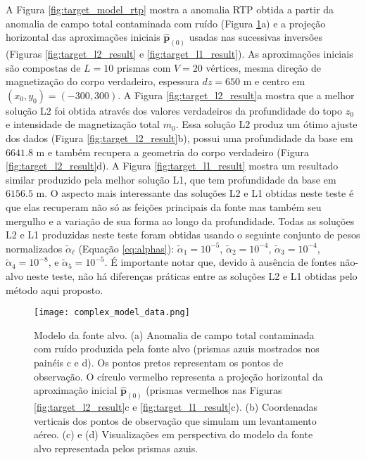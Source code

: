 A Figura \ref{fig:target_model_rtp} mostra a anomalia RTP obtida a partir da anomalia de campo total contaminada com ruído (Figura \ref{fig:target_model}a) e 
a projeção horizontal das aproximações iniciais $\hat{\mathbf{p}}_{(0)}$ 
usadas nas sucessivas inversões (Figuras \ref{fig:target_l2_result} e 
\ref{fig:target_l1_result}).
As aproximações iniciais são compostas de $ L= 10$ prismas com $ V = 20 $ vértices, mesma direção de magnetização do corpo verdadeiro, espessura $ dz=650 $ m e centro em $ (x_0, y_0) = (-300, 300) $.
A Figura \ref{fig:target_l2_result}a mostra que a melhor solução L2 foi obtida através dos valores verdadeiros da profundidade do topo $z_{0}$ e intensidade de magnetização total $m_{0}$. Essa solução L2 produz um ótimo ajuste dos dados (Figura \ref{fig:target_l2_result}b), possui uma profundidade da base em $6641.8$ m e também recupera a geometria do corpo verdadeiro (Figura \ref{fig:target_l2_result}d).
A Figura \ref{fig:target_l1_result} mostra um resultado similar produzido pela melhor solução L1, que tem profundidade da base em $6156.5$ m.
O aspecto mais interessante das soluções L2 e L1 obtidas neste teste é que elas recuperam não só as feições principais da fonte mas também seu mergulho e a variação de sua forma ao longo da profundidade.
Todas as soluções L2 e L1 produzidas neste teste foram obtidas usando o seguinte conjunto de pesos normalizados $\tilde{\alpha}_{\ell}$ (Equação \ref{eq:alphas}): 
$\tilde{\alpha}_{1} = 10^{-5}$, $\tilde{\alpha}_{2} = 10^{-4}$, 
$\tilde{\alpha}_{3} = 10^{-4}$, $\tilde{\alpha}_{4} = 10^{-8}$, e 
$\tilde{\alpha}_{5} = 10^{-5}$. 
É importante notar que, devido à ausência de fontes não-alvo neste teste, não há diferenças práticas entre as soluções L2 e L1 obtidas pelo método aqui proposto.


\begin{figure}[!htb]
	\centering
	\texttt{[image: complex\_model\_data.png]}
	\caption{Modelo da fonte alvo. (a) Anomalia de campo total contaminada com ruído produzida pela fonte alvo (prismas azuis mostrados nos painéis c e d). Os pontos pretos representam os pontos de observação. O círculo vermelho representa a projeção horizontal da aproximação inicial $\hat{\mathbf{p}}_{(0)}$ (prismas vermelhos nas Figuras
		\ref{fig:target_l2_result}c e \ref{fig:target_l1_result}c). (b) Coordenadas verticais dos pontos de observação que simulam um levantamento aéreo.
		(c) e (d) Visualizações em perspectiva do modelo da fonte alvo representada pelos prismas azuis.
	}
	\label{fig:target_model}
\end{figure}
\pagebreak

